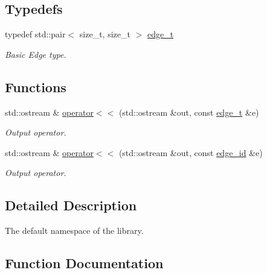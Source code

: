 \subsection*{Typedefs}
\begin{DoxyCompactItemize}
\item 
typedef std\+::pair$<$ size\+\_\+t, size\+\_\+t $>$ \hyperlink{namespacemerlin_a44eb24328668c9618f20915763bd3192}{edge\+\_\+t}\hypertarget{namespacemerlin_a44eb24328668c9618f20915763bd3192}{}\label{namespacemerlin_a44eb24328668c9618f20915763bd3192}

\begin{DoxyCompactList}\small\item\em Basic Edge type. \end{DoxyCompactList}\end{DoxyCompactItemize}
\subsection*{Functions}
\begin{DoxyCompactItemize}
\item 
std\+::ostream \& \hyperlink{namespacemerlin_a01feb9192b41e5bd4fb4a785595e6124}{operator$<$$<$} (std\+::ostream \&out, const \hyperlink{namespacemerlin_a44eb24328668c9618f20915763bd3192}{edge\+\_\+t} \&e)
\begin{DoxyCompactList}\small\item\em Output operator. \end{DoxyCompactList}\item 
std\+::ostream \& \hyperlink{namespacemerlin_ac50e5d216fd070db6c46c802bc5e2a51}{operator$<$$<$} (std\+::ostream \&out, const \hyperlink{structmerlin_1_1edge__id}{edge\+\_\+id} \&e)
\begin{DoxyCompactList}\small\item\em Output operator. \end{DoxyCompactList}\end{DoxyCompactItemize}


\subsection{Detailed Description}
The default namespace of the library. 

\subsection{Function Documentation}
